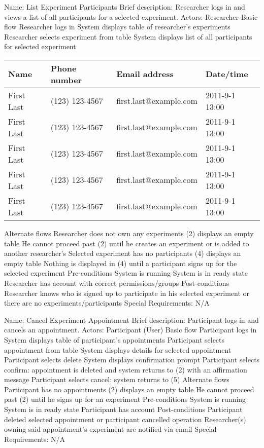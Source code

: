 \begin{outline}[enumerate]
\1 Name: List Experiment Participants
\2 Brief description: Researcher logs in and views a list of all participants for a selected experiment.
\2 Actors: Researcher
\2 Basic flow
\3 Researcher logs in
\3 System displays table of researcher's experiments
\3 Researcher selects experiment from table
\3 System displays list of all participants for selected experiment
        \begin{table}
            \begin{tabular}{|l|l|l|l|}
                \hline
                Name       & Phone number   & Email address          & Date/time      \\ \hline
                First Last & (123) 123-4567 & first.last@example.com & 2011-9-1 13:00 \\
                First Last & (123) 123-4567 & first.last@example.com & 2011-9-1 13:00 \\
                First Last & (123) 123-4567 & first.last@example.com & 2011-9-1 13:00 \\
                First Last & (123) 123-4567 & first.last@example.com & 2011-9-1 13:00 \\
                First Last & (123) 123-4567 & first.last@example.com & 2011-9-1 13:00 \\
                \hline
            \end{tabular}
        \end{table}
\2 Alternate flows
\3 Researcher does not own any experiments
\4 (2) displays an empty table
\4 He cannot proceed past (2) until he creates an experiment or is added to another researcher's
\3 Selected experiment has no participants
\4 (4) displays an empty table
\4 Nothing is displayed in (4) until a participant signs up for the selected experiment
\2 Pre-conditions
\3 System is running
\3 System is in ready state
\3 Researcher has account with correct permissions/groups
\2 Post-conditions
\3 Researcher knows who is signed up to participate in his selected experiment or there are no experiments/participants
\2 Special Requirements:
\3 N/A


\1 Name: Cancel Experiment Appointment
\2 Brief description: Participant logs in and cancels an appointment.
\2 Actors: Participant (User)
\2 Basic flow
\3 Participant logs in
\3 System displays table of participant's appointments
\3 Participant selects appointment from table
\3 System displays details for selected appointment
\3 Participant selects delete
\3 System displays confirmation prompt
\3 Participant selects confirm: appointment is deleted and system returns to (2) with an affirmation message
\3 Participant selects cancel: system returns to (5)
\2 Alternate flows
\3 Participant has no appointments
\4 (2) displays an empty table
\4 He cannot proceed past (2) until he signs up for an experiment
\2 Pre-conditions
\3 System is running
\3 System is in ready state
\3 Participant has account
\2 Post-conditions
\3 Participant deleted selected appointment or participant cancelled operation
\3 Researcher(s) owning said appointment's experiment are notified via email
\2 Special Requirements:
\3 N/A



\end{outline}
